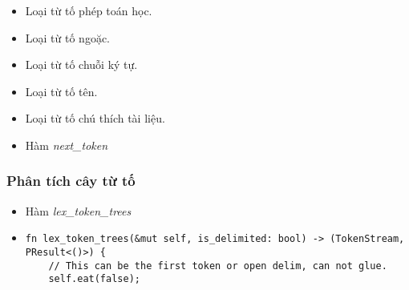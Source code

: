 {\begin{itemize}
\begin{lstlisting}
    /* Literals */
    Literal(Lit),
    
    Ident(Symbol, IdentIsRaw),
    
    /// A doc comment token.
    /// `Symbol` is the data of doc's comment excluding its "quotes" (`///`, `/**`, etc)
    DocComment(CommentKind, Option<DocStyle>, Symbol),
    
    /// End Of File.
    Eof,
}
\end{lstlisting}
  \item \label{ap1:flex_token_bin_op}Loại từ tố phép toán học.
  \item \label{ap1:flex_token_delimiter}Loại từ tố ngoặc.
  \item \label{ap1:flex_token_literal}Loại từ tố chuỗi ký tự.
  \item \label{ap1:flex_token_identifier}Loại từ tố tên.
  \item \label{ap1:flex_token_doc_cmt}Loại từ tố chú thích tài liệu.
  \item \label{ap1:flex_token_next_token}Hàm \textit{next\_token}
\end{itemize}

\subsubsection{Phân tích cây từ tố}
\begin{itemize}
    \item \label{ap1:token_tree_lex_token_trees}Hàm \textit{lex\_token\_trees}
    \item 
\begin{lstlisting}
fn lex_token_trees(&mut self, is_delimited: bool) -> (TokenStream, PResult<()>) {
    // This can be the first token or open delim, can not glue.
    self.eat(false);


\end{lstlisting}
\end{itemize}}
